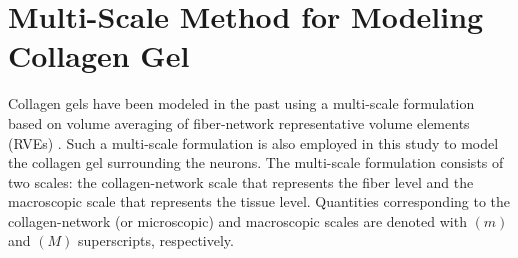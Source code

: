 \documentclass[]{interact}
\begin{document}
\section{Multi-Scale Method for Modeling Collagen Gel}
\label{sec:multi-scale_method}
Collagen gels have been modeled in the past using a multi-scale formulation based on volume averaging of fiber-network representative volume elements (RVEs) \citep{Chandran:2007hy,Stylianopoulos:2007dp,Lai:2012ji,Lake:2012jm}. Such a multi-scale formulation is also employed in this study to model the collagen gel surrounding the neurons. The multi-scale formulation consists of two scales: the collagen-network scale that represents the fiber level and the macroscopic scale that represents the tissue level. Quantities corresponding to the collagen-network (or microscopic) and macroscopic scales are denoted with $(m)$ and $(M)$ superscripts, respectively. 
\end{document}
